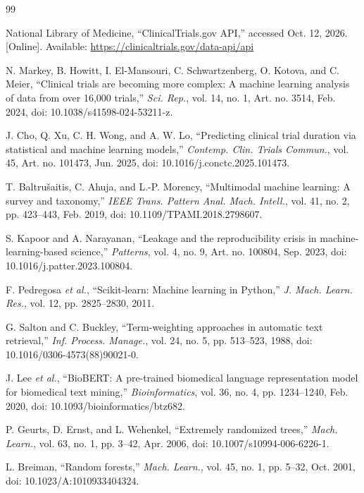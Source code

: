\documentclass[10pt,letterpaper,twocolumn]{article}
\begin{document}
\begin{thebibliography}{99}
\footnotesize

National Library of Medicine, ``ClinicalTrials.gov API,'' accessed Oct. 12, 2026. [Online]. Available: \url{https://clinicaltrials.gov/data-api/api}

\balance
{}
N. Markey, B. Howitt, I. El-Mansouri, C. Schwartzenberg, O. Kotova, and C. Meier, ``Clinical trials are becoming more complex: A machine learning analysis of data from over 16,000 trials,'' \emph{Sci. Rep.}, vol. 14, no. 1, Art. no. 3514, Feb. 2024, doi: 10.1038/s41598-024-53211-z.

J. Cho, Q. Xu, C. H. Wong, and A. W. Lo, ``Predicting clinical trial duration via statistical and machine learning models,'' \emph{Contemp. Clin. Trials Commun.}, vol. 45, Art. no. 101473, Jun. 2025, doi: 10.1016/j.conctc.2025.101473.

T. Baltru\v{s}aitis, C. Ahuja, and L.-P. Morency, ``Multimodal machine learning: A survey and taxonomy,'' \emph{IEEE Trans. Pattern Anal. Mach. Intell.}, vol. 41, no. 2, pp. 423--443, Feb. 2019, doi: 10.1109/TPAMI.2018.2798607.

S. Kapoor and A. Narayanan, ``Leakage and the reproducibility crisis in machine-learning-based science,'' \emph{Patterns}, vol. 4, no. 9, Art. no. 100804, Sep. 2023, doi: 10.1016/j.patter.2023.100804.

F. Pedregosa \emph{et al.}, ``Scikit-learn: Machine learning in Python,'' \emph{J. Mach. Learn. Res.}, vol. 12, pp. 2825--2830, 2011.

G. Salton and C. Buckley, ``Term-weighting approaches in automatic text retrieval,'' \emph{Inf. Process. Manage.}, vol. 24, no. 5, pp. 513--523, 1988, doi: 10.1016/0306-4573(88)90021-0.

J. Lee \emph{et al.}, ``BioBERT: A pre-trained biomedical language representation model for biomedical text mining,'' \emph{Bioinformatics}, vol. 36, no. 4, pp. 1234--1240, Feb. 2020, doi: 10.1093/bioinformatics/btz682.

P. Geurts, D. Ernst, and L. Wehenkel, ``Extremely randomized trees,'' \emph{Mach. Learn.}, vol. 63, no. 1, pp. 3--42, Apr. 2006, doi: 10.1007/s10994-006-6226-1.

L. Breiman, ``Random forests,'' \emph{Mach. Learn.}, vol. 45, no. 1, pp. 5--32, Oct. 2001, doi: 10.1023/A:1010933404324.


\end{thebibliography}
\end{document}
